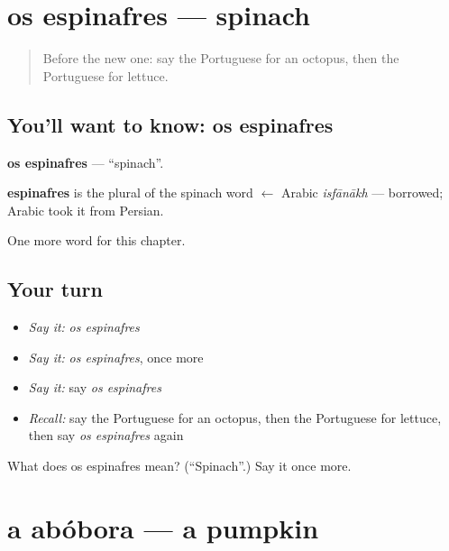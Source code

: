 \section[os espinafres]{os espinafres — spinach}

\label{lesson:PT-C168-espinafres}



\begin{quote}
Before the new one: say the Portuguese for an octopus, then the Portuguese for lettuce.
\end{quote}

\subsection*{You'll want to know: os espinafres}
\textbf{os espinafres} — \textquotedblleft{}spinach\textquotedblright{}.

\begin{cousinweb}
\textbf{espinafres} is the plural of the spinach word $\leftarrow$ Arabic \emph{isfānākh} — borrowed; Arabic took it from Persian.
\end{cousinweb}

\begin{grammarlens}[title={What you've built}]
One more word for this chapter.
\end{grammarlens}

\subsection*{Your turn}
\begin{itemize}
\raggedright
  \item \emph{Say it:} \emph{os espinafres}
  \item \emph{Say it:} \emph{os espinafres}, once more
  \item \emph{Say it:} say \emph{os espinafres}
  \item \emph{Recall:} say the Portuguese for an octopus, then the Portuguese for lettuce, then say \emph{os espinafres} again
\end{itemize}

\begin{tcolorbox}[breakable,colback=teal!4,colframe=teal!35!black,title={Before you move on}]
What does os espinafres mean? (\textquotedblleft{}Spinach\textquotedblright{}.) Say it once more.
\end{tcolorbox}
\section[a abóbora]{a abóbora — a pumpkin}

